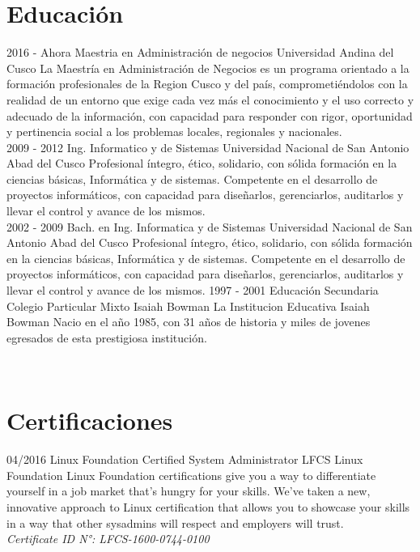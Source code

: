 \documentclass[]{friggeri-cv}
\begin{document}
\section{Educaci\'on}
\begin{entrylist}
    \entry
    {2016 - Ahora}
    {Maestria en Administraci\'on de negocios}
    {Universidad Andina del Cusco}
    {La Maestr\'ia en Administraci\'on de Negocios es un programa orientado a la formaci\'on
    profesionales de la Region Cusco y  del pa\'is, comprometi\'endolos con la realidad
    de un entorno que exige cada vez m\'as el conocimiento y el uso correcto y
    adecuado de la informaci\'on, con capacidad para responder con rigor, oportunidad
    y pertinencia social a los problemas locales, regionales y nacionales.\\}
    \entry
    {2009 - 2012}
    {Ing. Informatico y de Sistemas}
    {Universidad Nacional de San Antonio Abad del Cusco}
    {Profesional \'integro, \'etico, solidario, con s\'olida formaci\'on en la ciencias
    b\'asicas, Inform\'atica y de sistemas. Competente en el desarrollo de proyectos
    inform\'aticos, con capacidad para dise\~narlos, gerenciarlos, auditarlos y
    llevar el control y avance de los mismos.\\}
    \entry
    {2002 - 2009}
    {Bach. en Ing. Informatica y de Sistemas}
    {Universidad Nacional de San Antonio Abad del Cusco}
    {Profesional \'integro, \'etico, solidario, con s\'olida formaci\'on en la ciencias
    b\'asicas, Inform\'atica y de sistemas. Competente en el desarrollo de proyectos
    inform\'aticos, con capacidad para dise\~narlos, gerenciarlos, auditarlos y
    llevar el control y avance de los mismos.}
    \entry
    {1997 - 2001}
    {Educaci\'on Secundaria}
    {Colegio Particular Mixto Isaiah Bowman}
    {La Institucion Educativa Isaiah Bowman Nacio en el a\~no 1985, con 31 a\~nos de historia
    y miles de jovenes egresados de esta prestigiosa instituci\'on.}
\end{entrylist}
\\
\section{Certificaciones}
\begin{entrylist}
    \entry
    {04/2016}
    {Linux Foundation Certified System Administrator LFCS}
    {Linux Foundation}
    {Linux Foundation certifications give you a way to differentiate yourself in
    a job market that's hungry for your skills. We've taken a new, innovative
    approach to Linux certification that allows you to showcase your skills in a
     way that other sysadmins will respect and employers will trust.\\
     \emph{Certificate ID N°{:} LFCS-1600-0744-0100}}
\end{entrylist}
\newpage
\end{document}
